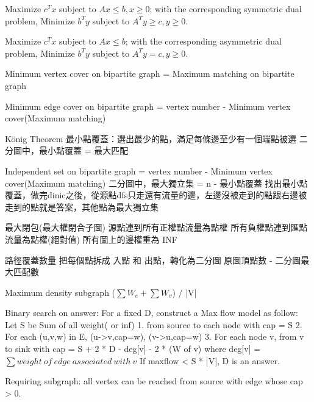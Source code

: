 Maximize $c^{T} x$ subject to $Ax ≤ b, x ≥ 0$;
with the corresponding symmetric dual problem,
Minimize $b^T y$ subject to $A^{T} y ≥ c, y ≥ 0$.

Maximize $c^{T} x$ subject to $Ax ≤ b$;
with the corresponding asymmetric dual problem,
Minimize $b^{T} y$ subject to $A^{T} y = c, y ≥ 0$. 

Minimum vertex cover on bipartite graph =
Maximum matching on bipartite graph

Minimum edge cover on bipartite graph =
vertex number - Minimum vertex cover(Maximum matching)

König Theorem
最小點覆蓋：選出最少的點，滿足每條邊至少有一個端點被選
二分圖中，最小點覆蓋 = 最大匹配

Independent set on bipartite graph =
vertex number - Minimum vertex cover(Maximum matching)
二分圖中，最大獨立集 = n - 最小點覆蓋
找出最小點覆蓋，做完dinic之後，從源點dfs只走還有流量的邊，左邊沒被走到的點跟右邊被走到的點就是答案，其他點為最大獨立集

最大閉包(最大權閉合子圖)
源點連到所有正權點流量為點權
所有負權點連到匯點流量為點權(絕對值)
所有圖上的邊權重為 INF

路徑覆蓋數量
把每個點拆成 入點 和 出點，轉化為二分圖
原圖頂點數 - 二分圖最大匹配數

Maximum density subgraph ($\sum W_e+\sum W_v$) / |V|

Binary search on answer:
For a fixed D, construct a Max flow model as follow:
Let S be Sum of all weight( or inf)
1. from source to each node with cap = S
2. For each (u,v,w) in E, (u->v,cap=w), (v->u,cap=w)
3. For each node v, from v to sink with cap = S + 2 * D - deg[v] - 2 * (W of v)
where deg[v] = $\sum weight\ of\ edge\ associated\ with\ v$
If maxflow < S * |V|, D is an answer.

Requiring subgraph: all vertex can be reached from source with
edge whose cap > 0.